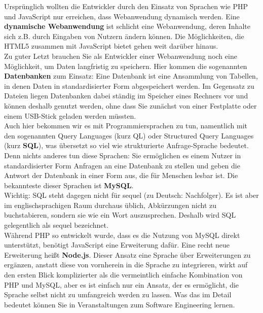 Ursprünglich wollten die Entwickler durch den Einsatz von Sprachen wie PHP und JavaScript nur erreichen, dass Webanwendung dynamisch werden. Eine \textbf{dynamische Webanwendung} ist schlicht eine Webanwendung, deren Inhalte sich z.B. durch Eingaben von Nutzern ändern können. Die Möglichkeiten, die HTML5 zusammen mit JavaScript bietet gehen weit darüber hinaus.\\

Zu guter Letzt brauchen Sie als Entwickler einer Webanwendung noch eine Möglichkeit, um Daten langfristig zu speichern. Hier kommen die sogenannten \textbf{Datenbanken} zum Einsatz: Eine Datenbank ist eine Ansammlung von Tabellen, in denen Daten in standardisierter Form abgespeichert werden. Im Gegensatz zu Dateien liegen Datenbanken dabei ständig im Speicher eines Rechners vor und können deshalb genutzt werden, ohne dass Sie zunächst von einer Festplatte oder einem USB-Stick geladen werden müssten.\\

Auch hier bekommen wir es mit Programmiersprachen zu tun, namentlich mit den sogenannten Query Languages (kurz QL) oder Structured Query Languages (kurz \textbf{SQL}), was übersetzt so viel wie strukturierte Anfrage-Sprache bedeutet. Denn nichts anderes tun diese Sprachen: Sie ermöglichen es einem Nutzer in standardisierter Form Anfragen an eine Datenbank zu stellen und geben die Antwort der Datenbank in einer Form aus, die für Menschen lesbar ist. Die bekannteste dieser Sprachen ist \textbf{MySQL}.\\

Wichtig: SQL steht dagegen nicht für sequel (zu Deutsch: Nachfolger). Es ist aber im englischsprachigen Raum durchaus üblich, Abkürzungen nicht zu buchstabieren, sondern sie wie ein Wort auszusprechen. Deshalb wird SQL gelegentlich als sequel bezeichnet.\\

Während PHP so entwickelt wurde, dass es die Nutzung von MySQL direkt unterstützt, benötigt JavaScript eine Erweiterung dafür. Eine recht neue Erweiterung heißt \textbf{Node.js}. Dieser Ansatz eine Sprache über Erweiterungen zu ergänzen, anstatt diese von vornherein in die Sprache zu integrieren, wirkt auf den ersten Blick komplizierter als die vermeintlich einfache Kombination von PHP und MySQL, aber es ist einfach nur ein Ansatz, der es ermöglicht, die Sprache selbst nicht zu umfangreich werden zu lassen. Was das im Detail bedeutet können Sie in Veranstaltungen zum Software Engineering lernen.

